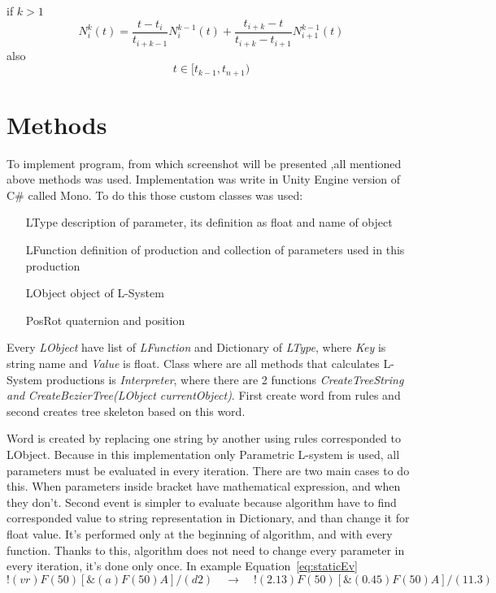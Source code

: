 \documentclass[b5paper,twoside,11pt]{article}
\begin{document}
  if $k > 1$
   \begin{equation}
  N_{i}^{k}(t)=\frac{t-t_i}{t_{i+k-1}} N_{i}^{k-1}(t) + \frac{t_{i+k} - t}{t_{i+k} - t_{i+1}} N_{i+1}^{k-1}(t)
 \end{equation}
 also
    \begin{equation}
    t\in[t_{k-1},t_{n+1})	
 \end{equation}

\section{Methods}
To implement program, from which screenshot will be presented ,all mentioned above methods was used. Implementation was write in Unity Engine version of C\# called Mono. To do this those custom classes was used:
\begin{itemize}[labelindent=5.5em,labelsep=1cm,leftmargin=*]
\item [LType] description of parameter, its definition as float and name of object
\item [LFunction] definition of production and collection of parameters used in this production
\item [LObject] object of L-System
\item [PosRot] quaternion and position
\end{itemize}
Every \textit{LObject} have list of \textit{LFunction} and Dictionary of \textit{LType}, where \textit{Key} is string name and \textit{Value} is float.
Class where are all methods that calculates L-System productions is \textit{Interpreter}, where there are 2  functions \textit{CreateTreeString and} \textit{CreateBezierTree(LObject currentObject)}. First create word from rules and second creates tree skeleton based on this word. \par
Word is created by replacing one string by another using rules corresponded to LObject. Because in this implementation only Parametric L-system is used, all parameters must be evaluated in every iteration. There are two main cases to do this. When parameters inside bracket have mathematical expression, and when they don't. Second event is simpler to evaluate because algorithm have to find corresponded value to string representation in Dictionary, and than change it for float value. It's performed only at the beginning of algorithm, and with every function. Thanks to this, algorithm does not need to change every parameter in every iteration, it's done only once.
In example Equation~\ref{eq:staticEv}
\begin{equation} \label{eq:staticEv}
!(vr)F(50)[ \&(a)F(50)A]/(d2) \quad\longrightarrow\quad !(2.13)F(50)[ \&(0.45)F(50)A]/(11.3)
 \end{equation}
\end{document}
